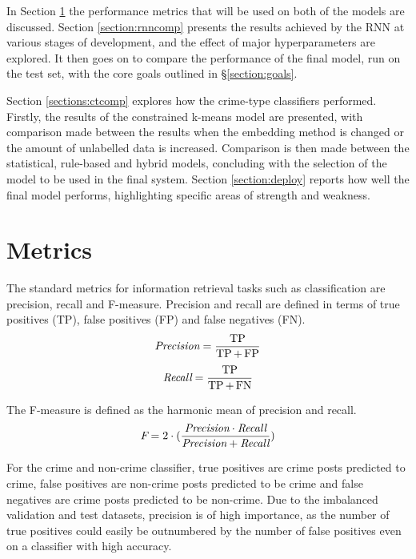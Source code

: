 \documentclass[12pt,a4paper,twoside,openright]{report}
\begin{document}
In Section \ref{section:metrics} the performance metrics that will be used on both of the models are discussed. Section \ref{section:rnncomp} presents the results achieved by the RNN at various stages of development, and the effect of major hyperparameters are explored. It then goes on to compare the performance of the final model, run on the test set, with the core goals outlined in \S\ref{section:goals}. 
\newline

Section \ref{sections:ctcomp} explores how the crime-type classifiers performed. Firstly, the results of the constrained k-means model are presented, with comparison made between the results when the embedding method is changed or the amount of unlabelled data is increased. Comparison is then made between the statistical, rule-based and hybrid models, concluding with the selection of the model to be used in the final system. Section \ref{section:deploy} reports how well the final model performs, highlighting specific areas of strength and weakness.



\section{Metrics}
\label{section:metrics}
The standard metrics for information retrieval tasks such as classification are precision, recall and F-measure. Precision and recall are defined in terms of true positives (TP), false positives (FP) and false negatives (FN). 
\begin{equation}
    \textit{\text{Precision}} = \frac{\operatorname{TP}}{\operatorname{TP} + \operatorname{FP}}
\end{equation}
\begin{equation}
    \textit{\text{Recall}} = \frac{\operatorname{TP}}{\operatorname{TP} + \operatorname{FN}}
\end{equation}

\noindent
The F-measure is defined as the harmonic mean of precision and recall.
\begin{equation}
    \textit{\text{F}} = 2 \cdot (\frac{\textit{\text{Precision}} \cdot \textit{\text{Recall}}}{\textit{\text{Precision}} + \textit{\text{Recall}}})
\end{equation}

\noindent
For the crime and non-crime classifier, true positives are crime posts predicted to crime, false positives are non-crime posts predicted to be crime and false negatives are crime posts predicted to be non-crime. Due to the imbalanced validation and test datasets, precision is of high importance, as the number of true positives could easily be outnumbered by the number of false positives even on a classifier with high accuracy.
\newline
\end{document}
